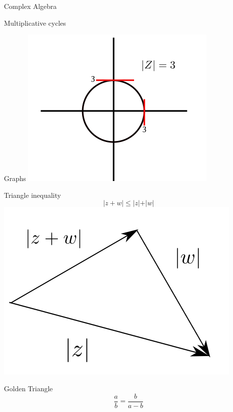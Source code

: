 \begin{section}{Complex Algebra}
\begin{subsection}{Multiplicative cycles}
	\end{subsection}
	\begin{subsection}{Graphs}
		\includegraphics[]{1.png}
	\end{subsection}
	\newpage
	\begin{subsection}{Triangle inequality}
		$$\vert z + w \vert \leq \vert z \vert + \vert w \vert$$
		\includegraphics[]{2.png}
	\end{subsection}
	\begin{subsection}{Golden Triangle}
		$$ \frac{a}{b} = \frac{b}{a-b} $$
	\end{subsection}

\end{section}


